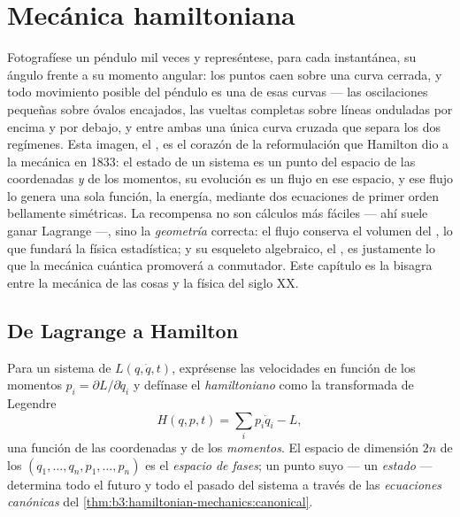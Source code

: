\chapter{Mecánica hamiltoniana}\label{ch:b3:hamiltonian-mechanics}

Fotografíese un péndulo mil veces y represéntese, para cada instantánea, su
ángulo frente a su momento angular: los puntos caen sobre una curva cerrada,
y todo movimiento posible del péndulo es una de esas curvas --- las
oscilaciones pequeñas sobre óvalos encajados, las vueltas completas sobre
líneas onduladas por encima y por debajo, y entre ambas una única curva
cruzada que separa los dos regímenes. Esta imagen, el \emph{}, es el corazón de la reformulación que Hamilton dio a la mecánica en
1833: el estado de un sistema es un punto del espacio de las coordenadas
\emph{y} de los momentos, su evolución es un flujo en ese espacio, y ese
flujo lo genera una sola función, la energía, mediante dos ecuaciones de
primer orden bellamente simétricas. La recompensa no son cálculos más
fáciles --- ahí suele ganar Lagrange ---, sino la \emph{geometría} correcta:
el flujo conserva el volumen del , lo que fundará la física
estadística; y su esqueleto algebraico, el , es
justamente lo que la mecánica cuántica promoverá a conmutador. Este capítulo
es la bisagra entre la mecánica de las cosas y la física del siglo XX.

\section{De Lagrange a Hamilton}

\begin{definition}\label{def:b3:hamiltonian-mechanics:hamiltonian}
Para un sistema de  $L(q, \dot q, t)$, exprésense las velocidades
en función de los momentos $p_i = \partial L/\partial\dot q_i$ y defínase
el \emph{hamiltoniano} como la transformada de Legendre
\[
H(q, p, t) = \sum_i p_i\dot q_i - L ,
\]
una función de las coordenadas y de los \emph{momentos}. El espacio de
dimensión $2n$ de los $(q_1, \dots, q_n, p_1, \dots, p_n)$ es el
\emph{espacio de fases}; un punto suyo --- un \emph{estado} --- determina
todo el futuro y todo el pasado del sistema a través de las
\emph{ecuaciones canónicas} del
\cref{thm:b3:hamiltonian-mechanics:canonical}.
\end{definition}

